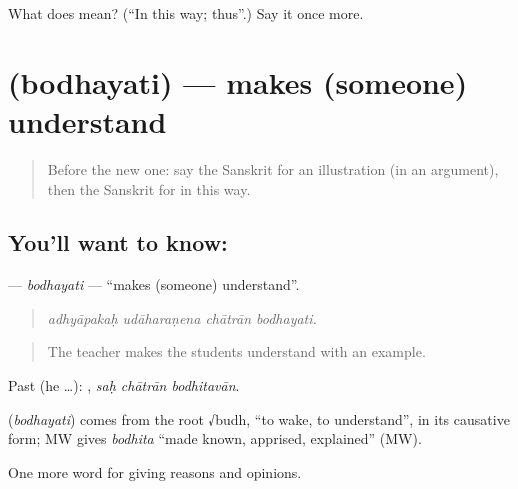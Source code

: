 \begin{tcolorbox}[breakable,colback=teal!4,colframe=teal!35!black,title={Before you move on}]
What does  mean? (\textquotedblleft{}In this way; thus\textquotedblright{}.) Say it once more.
\end{tcolorbox}
\section[\texorpdfstring{\sk{बोधयति} (bodhayati)}{बोधयति (bodhayati)}]{ (bodhayati) — makes (someone) understand}

\label{lesson:SA-C347-bodhayati}



\begin{quote}
Before the new one: say the Sanskrit for an illustration (in an argument), then the Sanskrit for in this way.
\end{quote}

\subsection*{You'll want to know: }
\textbf{} — \emph{bodhayati} — \textquotedblleft{}makes (someone) understand\textquotedblright{}.

\begin{quote}
   
\end{quote}

\begin{quote}
\emph{adhyāpakaḥ udāharaṇena chātrān bodhayati.}
\end{quote}

\begin{quote}
The teacher makes the students understand with an example.
\end{quote}

Past (he …):   , \emph{saḥ chātrān bodhitavān}.

\begin{cousinweb}
\textbf{} (\emph{bodhayati}) comes from the root √budh, \textquotedblleft{}to wake, to understand\textquotedblright{}, in its causative form; MW gives \emph{bodhita} \textquotedblleft{}made known, apprised, explained\textquotedblright{} (MW).
\end{cousinweb}

\begin{grammarlens}[title={What you've built}]
One more word for giving reasons and opinions.
\end{grammarlens}

